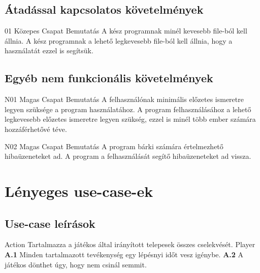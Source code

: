 \documentclass[../../projlab]{subfiles}
\begin{document}
\subsection{Átadással kapcsolatos követelmények}
\begin{kovetelmeny}
    {01} %
    {Közepes} %
    {Csapat} %
    {Bemutatás} %
    {A kész programnak minél kevesebb file-ból kell állnia.} %
	A kész programnak a lehető legkevesebb file-ból kell állnia, hogy a használatát ezzel is segítsük.
\end{kovetelmeny}

\subsection{Egyéb nem funkcionális követelmények}
\begin{kovetelmeny}
    {N01} %
    {Magas} %
    {Csapat} %
    {Bemutatás} %
    {A felhasználónak minimális előzetes ismeretre legyen szüksége a program használatához.} %
	A program felhasználásához a lehető legkevesebb előzetes ismeretre legyen szükség, ezzel is minél több ember számára hozzáférhetővé téve.
\end{kovetelmeny}

\begin{kovetelmeny}
    {N02} %
    {Magas} %
    {Csapat} %
    {Bemutatás} %
    {A program bárki számára értelmezhető hibaüzeneteket ad.} %
	A program a felhasználását segítő hibaüzeneteket ad vissza.
\end{kovetelmeny}

\section{Lényeges use-case-ek}
\subsection{Use-case leírások}

\begin{use-case}
	{Action}
	{Tartalmazza a játékos által irányított telepesek összes cselekvését.}
	{Player}
    \textbf{A.1} Minden tartalmazott tevékenység egy lépésnyi időt vesz igénybe. \newline
	\textbf{A.2} A játékos dönthet úgy, hogy nem csinál semmit.
\end{use-case}
\end{document}
